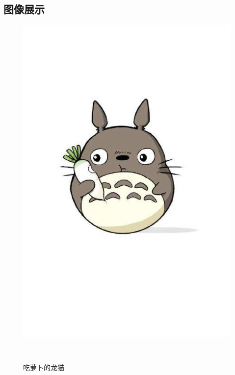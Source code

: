 \documentclass[12pt]{ctexart}
\begin{document}
\begin{spacing}{1.5}
\subsection{图像展示}
\begin{figure}[h]
	\centering
	\begin{minipage}[t]{0.3\linewidth}
		\includegraphics[width=1\textwidth]{figures/1.jpg}
		\caption*{吃萝卜的龙猫}
	\end{minipage} 
	\hfill
	\begin{minipage}[t]{0.3\linewidth}

\end{minipage}
\end{figure}
\end{spacing}
\end{document}
